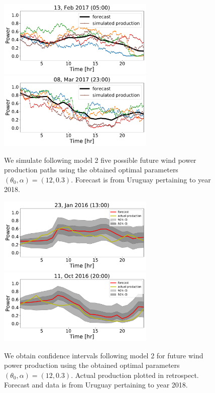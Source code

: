 \documentclass[10pt,twocolumn,letterpaper]{article}
\begin{document}
    \begin{figure}
      \includegraphics[width=75mm,scale=1]{simulated/24hr/1099.pdf}
      \includegraphics[width=75mm,scale=1]{simulated/24hr/1178.pdf}
      \caption{We simulate following model 2  five possible future wind power production paths using the obtained optimal parameters $(\theta_0, \alpha )=(12,0.3)$. Forecast is from Uruguay pertaining to  year 2018. }
    \end{figure}

    \begin{figure}
      \includegraphics[width=75mm,scale=1]{confidence_intervals/24hr/31.pdf}
      \includegraphics[width=75mm,scale=1]{confidence_intervals/24hr/820.pdf}
       \caption{We obtain confidence intervals following model 2  for future wind power production using the obtained optimal parameters $(\theta_0, \alpha )=(12,0.3)$. Actual production plotted in retrospect. Forecast and data is from Uruguay pertaining to  year 2018. }
    \end{figure}
\end{document}
